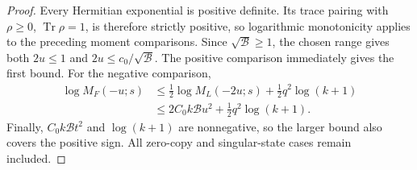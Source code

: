 \begin{proof}
\leanok
Every Hermitian exponential is positive definite. Its trace pairing with
$\rho\ge0$, $\operatorname{Tr}\rho=1$, is therefore strictly positive,
so logarithmic monotonicity applies to the preceding moment comparisons.
Since $\sqrt{\mathcal B}\ge1$, the chosen range gives both $2u\le1$ and
$2u\le c_0/\sqrt{\mathcal B}$. The positive comparison immediately gives
the first bound. For the negative comparison,
\begin{align*}
 \log M_F(-u;s)
 &\le \tfrac12\log M_L(-2u;s)+\tfrac12 q^2\log(k+1)\\
 &\le 2C_0k\mathcal B u^2+\tfrac12 q^2\log(k+1).
\end{align*}
Finally, $C_0k\mathcal B t^2$ and $\log(k+1)$ are nonnegative, so the
larger bound also covers the positive sign. All zero-copy and singular-state
cases remain included.
\end{proof}
